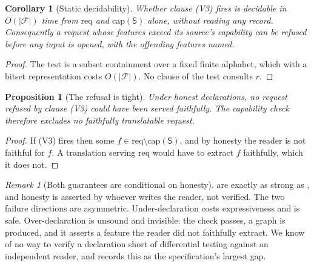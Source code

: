 \documentclass[11pt,twocolumn,a4paper]{article}
\theoremstyle{msthm}
\newtheorem{proposition}[theorem]{Proposition}
\newtheorem{corollary}[theorem]{Corollary}
\theoremstyle{definition}
\theoremstyle{remark}
\newtheorem{remark}[theorem]{Remark}
\newcommand{\Src}{\mathsf{S}}
\newcommand{\Feat}{\mathcal{F}}
\newcommand{\Capset}{\mathrm{cap}}
\newcommand{\Req}{\mathrm{req}}
\newcommand{\abs}[1]{\lvert#1\rvert}
\begin{document}
\begin{corollary}[Static decidability]
\label{cor:static}
Whether clause (V3) fires is decidable in $O(\abs{\Feat})$ time from
$\Req$ and $\Capset(\Src)$ alone, without reading any record. Consequently
a request whose features exceed its source's capability can be refused
before any input is opened, with the offending features named.
\end{corollary}

\begin{proof}
The test is a subset containment over a fixed finite alphabet, which
with a bitset representation costs $O(\abs{\Feat})$. No clause of the
test consults $r$.
\end{proof}

\begin{proposition}[The refusal is tight]
\label{prop:tight}
Under honest declarations, no request refused by clause (V3) could have
been served faithfully. The capability check therefore excludes no
faithfully translatable request.
\end{proposition}

\begin{proof}
If (V3) fires then some $f\in\Req\setminus\Capset(\Src)$, and by honesty
the reader is not faithful for $f$. A translation serving $\Req$ would
have to extract $f$ faithfully, which it does not.
\end{proof}

\begin{remark}[Both guarantees are conditional on honesty]
\label{rem:honesty}
 are exactly as strong as
, and honesty is asserted by whoever writes the reader,
not verified. The two failure directions are asymmetric.
Under-declaration costs expressiveness and is safe. Over-declaration is
unsound and invisible: the check passes, a graph is produced, and it
asserts a feature the reader did not faithfully extract. We know of no
way to verify a declaration short of differential testing against an
independent reader, and  records this as the
specification's largest gap.
\end{remark}
\end{document}
